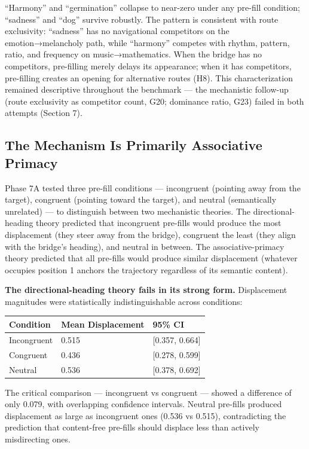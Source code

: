 ``Harmony'' and ``germination'' collapse to near-zero under any pre-fill condition; ``sadness'' and ``dog'' survive robustly. The pattern is consistent with route exclusivity: ``sadness'' has no navigational competitors on the emotion→melancholy path, while ``harmony'' competes with rhythm, pattern, ratio, and frequency on music→mathematics. When the bridge has no competitors, pre-filling merely delays its appearance; when it has competitors, pre-filling creates an opening for alternative routes (H8). This characterization remained descriptive throughout the benchmark --- the mechanistic follow-up (route exclusivity as competitor count, G20; dominance ratio, G23) failed in both attempts (Section 7).

\subsection{The Mechanism Is Primarily Associative Primacy}\label{the-mechanism-is-primarily-associative-primacy}

Phase 7A tested three pre-fill conditions --- incongruent (pointing away from the target), congruent (pointing toward the target), and neutral (semantically unrelated) --- to distinguish between two mechanistic theories. The directional-heading theory predicted that incongruent pre-fills would produce the most displacement (they steer away from the bridge), congruent the least (they align with the bridge's heading), and neutral in between. The associative-primacy theory predicted that all pre-fills would produce similar displacement (whatever occupies position 1 anchors the trajectory regardless of its semantic content).

\textbf{The directional-heading theory fails in its strong form.} Displacement magnitudes were statistically indistinguishable across conditions:

\begin{longtable}[]{@{}lll@{}}
\toprule\noalign{}
Condition & Mean Displacement & 95\% CI \\
\midrule\noalign{}
\endhead
\bottomrule\noalign{}
\endlastfoot
Incongruent & 0.515 & {[}0.357, 0.664{]} \\
Congruent & 0.436 & {[}0.278, 0.599{]} \\
Neutral & 0.536 & {[}0.378, 0.692{]} \\
\end{longtable}

The critical comparison --- incongruent vs congruent --- showed a difference of only 0.079, with overlapping confidence intervals. Neutral pre-fills produced displacement as large as incongruent ones (0.536 vs 0.515), contradicting the prediction that content-free pre-fills should displace less than actively misdirecting ones.

